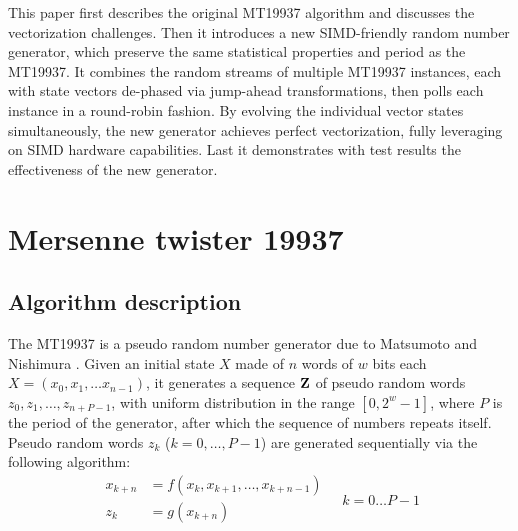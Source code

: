 \documentclass[preprint,1p,times]{elsarticle}
\begin{document}
This paper first describes the original MT19937 algorithm and discusses the vectorization challenges. Then it introduces a new SIMD-friendly random number generator, which preserve the same statistical properties and period as the MT19937. It combines the random streams of multiple MT19937 instances, each with state vectors de-phased via jump-ahead transformations, then polls each instance in a round-robin fashion. By evolving the individual vector states simultaneously, the new generator achieves perfect vectorization, fully leveraging on SIMD hardware capabilities. Last it demonstrates with test results the effectiveness of the new generator.

\section{Mersenne twister 19937}
\label{sec:mt19937}
\subsection{Algorithm description}
The MT19937 is a pseudo random number generator due to Matsumoto and Nishimura \cite{mt19937}.
Given an initial state $X$ made of $n$ words of $w$ bits each $X=(x_0, x_1, \dots x_{n-1})$, it generates a sequence $\bold{Z}$ of pseudo random words $z_{0}, z_{1}, \dots, z_{n+P-1}$, with uniform distribution in the range $[0, 2^w-1]$, where $P$ is the period of the generator, after which the sequence of numbers repeats itself. \\

Pseudo random words $z_k$ ($k=0, \dots, P-1$) are generated sequentially via the following algorithm:
\begin{equation}
\label{eq:formula}
\begin{aligned}
    x_{k+n} &= f(x_{k}, x_{k+1},\dots, x_{k+n-1}) \\
    z_k &= g(x_{k+n}) \\
\end{aligned}
\quad k=0\dots P-1
\end{equation}
\end{document}

